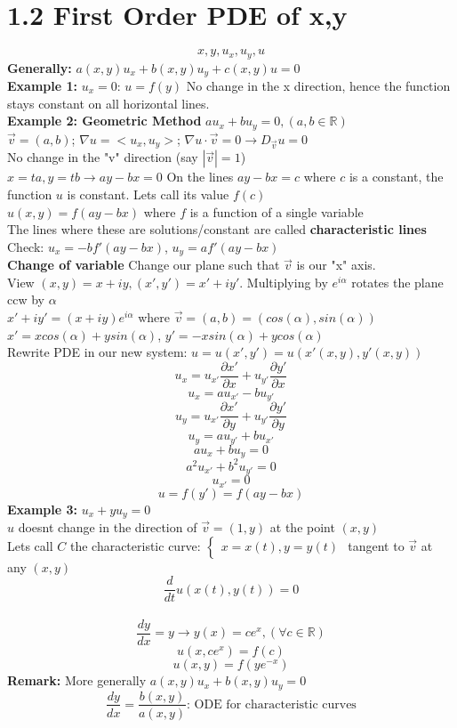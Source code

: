 \documentclass{article}
\newcommand{\partialfrac}[2]{\frac{\partial #1}{\partial #2}}
\newcommand{\ddt}{\frac{d}{dt}}
\newcommand{\dyx}{\frac{dy}{dx}}
\begin{document}
\section*{1.2 First Order PDE of x,y}
$$x, y, u_x, u_y, u $$
\textbf{Generally:} $a(x,y)u_x + b(x,y)u_y + c(x,y)u = 0$\\
\textbf{Example 1:} $u_x = 0$: $u = f(y)$ No change in the x direction, hence the function stays constant on all horizontal lines.\\ 
\textbf{Example 2: Geometric Method} $au_x + bu_y = 0, (a,b \in \mathds{R})$\\
$\vec{v} = (a,b)$; $\nabla u = <u_x, u_y>$; $\nabla u \cdot \vec{v} = 0 \rightarrow D_{\vec{v}}u = 0$\\
No change in the "v" direction (say $|\vec{v}| = 1$)\\
$x = ta, y = tb \rightarrow ay-bx=0$
On the lines $ay-bx = c$ where $c$ is a constant, the function $u$ is constant. Lets call its value $f(c)$\\
$u(x,y) = f(ay-bx)$ where $f$ is a function of a single variable\\
The lines where these are solutions/constant are called \textbf{characteristic lines}\\ 
Check: $u_x = -bf'(ay-bx)$, $u_y = af'(ay-bx)$\\
\textbf{Change of variable}
Change our plane such that $\vec{v}$ is our "x" axis.\\
View $(x,y) = x + iy, (x',y') = x' + iy'$. Multiplying by $e^{i\alpha}$ rotates the plane ccw by $\alpha$\\
$x'+iy' = (x+iy)e^{i\alpha}$ where $\vec{v} = (a,b) = (cos(\alpha), sin(\alpha))$\\
$x' = xcos(\alpha) + y sin(\alpha)$, $y' = -xsin(\alpha) + ycos(\alpha)$\\
Rewrite PDE in our new system: $u = u(x',y') = u(x'(x,y),y'(x,y))$\\
$$u_x = u_{x'}\partialfrac{x'}{x} + u_{y'}\partialfrac{y'}{x}$$
$$u_x = au_{x'} - bu_{y'}$$
$$u_y = u_{x'}\partialfrac{x'}{y} + u_{y'}\partialfrac{y'}{y}$$
$$u_y = au_{y'} + bu_{x'}$$
$$au_x + bu_y = 0$$
$$a^2u_{x'} + b^2u_{y'} = 0$$
$$u_{x'} = 0$$
$$u = f(y') = f(ay-bx)$$
\textbf{Example 3:} $u_x + yu_y = 0$\\
$u$ doesnt change in the direction of $\vec{v} = (1,y)$ at the point $(x,y)$\\
Lets call $C$ the characteristic curve: $\begin{cases} x = x(t), y = y(t) \end{cases}$ tangent to $\vec{v}$ at any $(x,y)$\\
$$\ddt u(x(t),y(t)) = 0$$\\
$$\dyx = y \rightarrow y(x) = c e^{x}, (\forall c \in \mathds{R})$$
$$u(x,ce^x) = f(c)$$
$$u(x,y) = f(ye^{-x})$$
\textbf{Remark:} More generally $a(x,y)u_x + b(x,y)u_y = 0$\\
$$\dyx = \frac{b(x,y)}{a(x,y)} \text{: ODE for characteristic curves}$$
\end{document}
